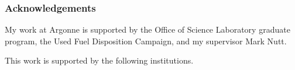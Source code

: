\begin{frame}[ctb!]
  \frametitle{Acknowledgements}  
  My work at Argonne is supported by the Office of Science Laboratory graduate 
  program, the Used Fuel Disposition Campaign, and my supervisor Mark Nutt.

  This work is supported by the following institutions. 

  \begin{figure}[htp]
    \centering
    \\ 
    \\
  \end{figure}

\end{frame}
